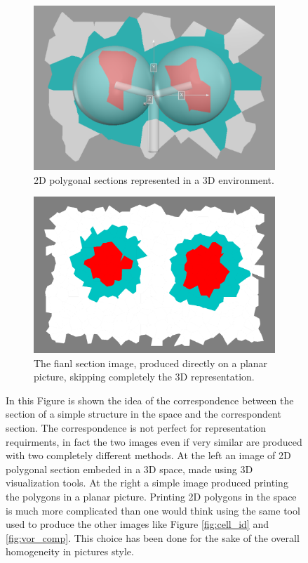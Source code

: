     \begin{figure}[h]
        \centering
        \begin{subfigure}[t]{0.45\textwidth}
             \centering
             \includegraphics[width = \textwidth]{images/sec_3D}
             \caption{2D polygonal sections represented in a 3D environment.}
             \label{fig:sec_3D}
        \end{subfigure}
        \hfill
        \begin{subfigure}[t]{0.45\textwidth}
             \centering
             \includegraphics[width = \textwidth]{images/section_simple}
             \caption{The fianl section image, produced directly on a planar picture, skipping completely the 3D representation.}
             \label{fig:section_simple}
        \end{subfigure}
        \caption{In this Figure is shown the idea of the correspondence between the section of a simple structure in the space and the correspondent section. The correspondence is not perfect for representation requirments, in fact the two images even if very similar are produced with two completely different methods. At the left an image of 2D polygonal section embeded in a 3D space, made using 3D visualization tools. At the right a simple image produced printing the polygons in a planar picture. Printing 2D polygons in the space is much more complicated than one would think using the same tool used to produce the other images like Figure \ref{fig:cell_id} and \ref{fig:vor_comp}. This choice has been done for the sake of the overall homogeneity in pictures style.}

\end{figure}
